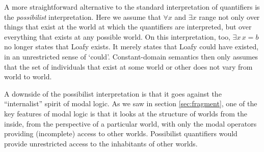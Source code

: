 


A more straightforward alternative to the standard interpretation of quantifiers
is the \emph{possibilist} interpretation. Here we assume that $\forall x$ and
$\exists x$ range not only over things that exist at the world at which the
quantifiers are interpreted, but over everything that exists at any possible
world. On this interpretation, too, $\exists x\, x\!=\!b$ no longer states that Loafy
exists. It merely states that Loafy could have existed, in an unrestricted sense
of `could'. Constant-domain semantics then only assumes that the set of
individuals that exist at some world or other does not vary from world to world.



A  downside of the possibilist interpretation is that it goes against the
``internalist'' spirit of modal logic. As we saw in section \ref{sec:fragment},
one of the key features of modal logic is that it looks at the structure of
worlds from the inside, from the perspective of a particular world, with only
the modal operators providing (incomplete) access to other worlds.  Possibilist
quantifiers would provide unrestricted access to the inhabitants of other
worlds.

